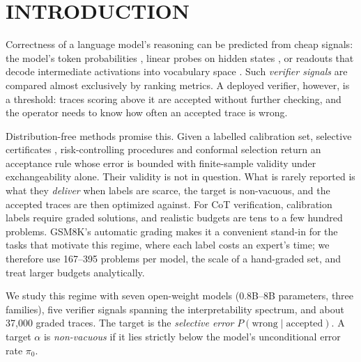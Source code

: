 \documentclass[twoside]{article}
\theoremstyle{remark}
\newcommand{\pizero}{\pi_0}
\begin{document}
\section{INTRODUCTION}

Correctness of a language model's reasoning can be predicted from cheap signals: the model's token probabilities \citep{kadavath2022know}, linear probes on hidden states \citep{azaria2023internal,burns2023discovering,zhang2025reasoning}, or readouts that decode intermediate activations into vocabulary space \citep{nostalgebraist2020logit,belrose2023tuned,gurnee2026workspace}. Such \emph{verifier signals} are compared almost exclusively by ranking metrics. A deployed verifier, however, is a threshold: traces scoring above it are accepted without further checking, and the operator needs to know how often an accepted trace is wrong.

Distribution-free methods promise this. Given a labelled calibration set, selective certificates \citep{geifman2017selective}, risk-controlling procedures \citep{bates2021rcps,angelopoulos2021ltt} and conformal selection \citep{jin2023selection,gui2024conformal} return an acceptance rule whose error is bounded with finite-sample validity under exchangeability alone. Their validity is not in question. What is rarely reported is what they \emph{deliver} when labels are scarce, the target is non-vacuous, and the accepted traces are then optimized against. For CoT verification, calibration labels require graded solutions, and realistic budgets are tens to a few hundred problems. GSM8K's automatic grading makes it a convenient stand-in for the tasks that motivate this regime, where each label costs an expert's time; we therefore use 167--395 problems per model, the scale of a hand-graded set, and treat larger budgets analytically.

We study this regime with seven open-weight models (0.8B--8B parameters, three families), five verifier signals spanning the interpretability spectrum, and about 37{,}000 graded traces. The target is the \emph{selective error} $P(\text{wrong}\mid\text{accepted})$. A target $\alpha$ is \emph{non-vacuous} if it lies strictly below the model's unconditional error rate $\pizero$.
\end{document}
